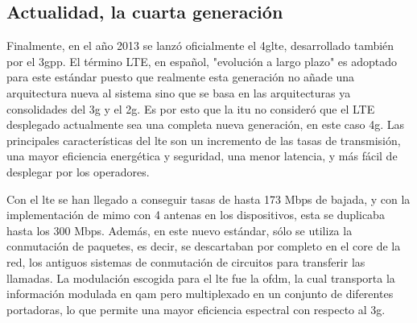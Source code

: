 \subsection{Actualidad, la cuarta generación}
\par Finalmente, en el año 2013 se lanzó oficialmente el \gls{4glte}, desarrollado también por el \gls{3gpp}. El término LTE, en español, "evolución a largo plazo" es adoptado para este estándar puesto que realmente esta generación no añade una arquitectura nueva al sistema sino que se basa en las arquitecturas ya consolidades del \gls {3g} y el \gls{2g}. Es por esto que la \gls{itu} no consideró que el LTE desplegado actualmente sea una completa nueva generación, en este caso \gls{4g}. Las principales características del \gls{lte} son un incremento de las tasas de transmisión, una mayor eficiencia energética y seguridad, una menor latencia, y más fácil de desplegar por los operadores.
\\
\par Con el \gls{lte} se han llegado a conseguir tasas de hasta 173 Mbps de bajada, y con la implementación de \gls{mimo} con 4 antenas en los dispositivos, esta se duplicaba hasta los 300 Mbps. Además, en este nuevo estándar, sólo se utiliza la conmutación de paquetes, es decir, se descartaban por completo en el core de la red, los antiguos sistemas de conmutación de circuitos para transferir las llamadas. La modulación escogida para el \gls{lte} fue la \gls{ofdm}, la cual transporta la información modulada en \gls{qam} pero multiplexado en un conjunto de diferentes portadoras, lo que permite una mayor eficiencia espectral con respecto al \gls{3g}.
